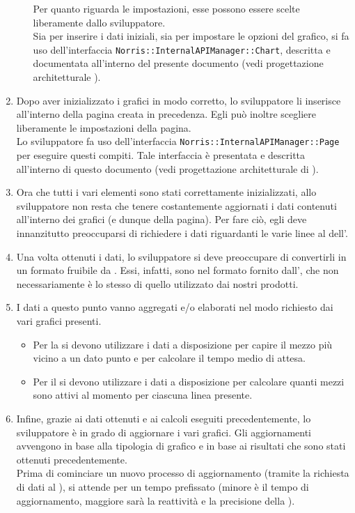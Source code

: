 \begin{enumerate}
\begin{itemize}
                Per quanto riguarda le impostazioni, esse possono essere scelte liberamente dallo sviluppatore.\\
                Sia per inserire i dati iniziali, sia per impostare le opzioni del grafico, si fa uso dell'interfaccia \texttt{Norris::InternalAPIManager::Chart}, descritta e documentata all'interno del presente documento (vedi progettazione architetturale ).
            \end{itemize}
            \item Dopo aver inizializzato i grafici in modo corretto, lo sviluppatore li inserisce all'interno della pagina creata in precedenza. Egli può inoltre scegliere liberamente le impostazioni della pagina.\\
            Lo sviluppatore fa uso dell'interfaccia \texttt{Norris::InternalAPIManager::Page} per eseguire questi compiti. Tale interfaccia è presentata e descritta all'interno di questo documento (vedi progettazione architetturale di ).
            \item Ora che tutti i vari elementi sono stati correttamente inizializzati, allo sviluppatore non resta che tenere costantemente aggiornati i dati contenuti all'interno dei grafici (e dunque della pagina). Per fare ciò, egli deve innanzitutto preoccuparsi di richiedere i dati riguardanti le varie linee al  dell'.
            \item Una volta ottenuti i dati, lo sviluppatore si deve preoccupare di convertirli in un formato fruibile da . Essi, infatti, sono nel formato fornito dall', che non necessariamente è lo stesso di quello utilizzato dai nostri prodotti.
            \item I dati a questo punto vanno aggregati e/o elaborati nel modo richiesto dai vari grafici presenti.
            \begin{itemize}
                \item Per la  si devono utilizzare i dati a disposizione per capire il mezzo più vicino a un dato punto e per calcolare il tempo medio di attesa.
                \item Per il  si devono utilizzare i dati a disposizione per calcolare quanti mezzi sono attivi al momento per ciascuna linea presente.
            \end{itemize}
            \item Infine, grazie ai dati ottenuti e ai calcoli eseguiti precedentemente, lo sviluppatore è in grado di aggiornare i vari grafici. Gli aggiornamenti avvengono in base alla tipologia di grafico e in base ai risultati che sono stati ottenuti precedentemente.\\
            Prima di cominciare un nuovo processo di aggiornamento (tramite la richiesta di dati al  ), si attende per un tempo prefissato (minore è il tempo di aggiornamento, maggiore sarà la reattività e la precisione della ).
        \end{enumerate}
